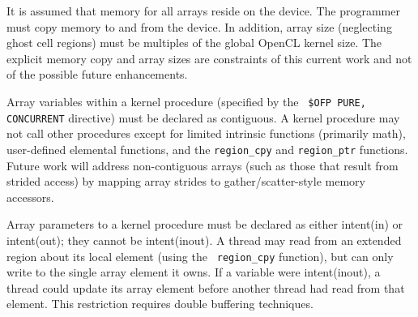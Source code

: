 It is assumed that memory for all arrays reside on the device.  The
programmer must copy memory to and from the device.  In addition,
array size (neglecting ghost cell regions) must be multiples of the
global OpenCL kernel size.  The explicit memory copy and array sizes
are constraints of this current work and not of the possible future
enhancements.

Array variables within a kernel procedure (specified by the {\tt
  \!\$OFP PURE, CONCURRENT} directive) must be declared as contiguous.  A
kernel procedure may not call other procedures except for limited
intrinsic functions (primarily math), user-defined elemental
functions, and the {\tt region\_cpy} and {\tt region\_ptr} functions.
Future work will address non-contiguous arrays (such as those that
result from strided access) by mapping array strides to
gather/scatter-style memory accessors.

Array parameters to a kernel procedure must be declared as either
intent(in) or intent(out); they cannot be intent(inout).  A thread may
read from an extended region about its local element (using the {\tt
  region\_cpy} function), but can only write to the single array
element it owns.  If a variable were intent(inout), a thread could
update its array element before another thread had read from that
element.  This restriction requires double buffering techniques.

